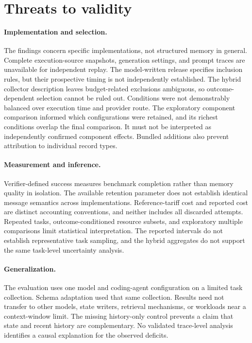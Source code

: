 \section{Threats to validity}
\label{sec:threats}

\paragraph{Implementation and selection.}
The findings concern specific implementations, not structured memory in
general. Complete execution-source snapshots, generation settings, and
prompt traces are unavailable for independent replay. The model-written
release specifies inclusion rules, but their prospective timing is not
independently established. The hybrid collector description leaves
budget-related exclusions ambiguous, so outcome-dependent selection cannot
be ruled out. Conditions were not demonstrably balanced over execution
time and provider route. The exploratory component comparison informed
which configurations were retained, and its richest conditions overlap
the final comparison. It must not be interpreted as independently
confirmed component effects. Bundled additions also prevent attribution
to individual record types.

\paragraph{Measurement and inference.}
Verifier-defined success measures benchmark completion rather than memory
quality in isolation. The available retention parameter does not establish
identical message semantics across implementations. Reference-tariff cost
and reported cost are distinct accounting conventions, and neither
includes all discarded attempts. Repeated tasks, outcome-conditioned
resource subsets, and exploratory multiple comparisons limit statistical
interpretation. The reported intervals do not establish representative
task sampling, and the hybrid aggregates do not support the same
task-level uncertainty analysis.

\paragraph{Generalization.}
The evaluation uses one model and coding-agent configuration on a limited
task collection. Schema adaptation used that same collection. Results need
not transfer to other models, state writers, retrieval mechanisms, or
workloads near a context-window limit. The missing history-only control
prevents a claim that state and recent history are complementary. No
validated trace-level analysis identifies a causal explanation for the
observed deficits.

